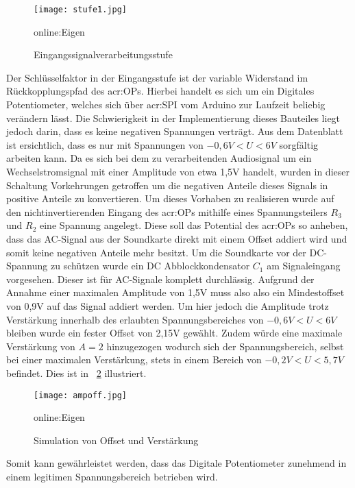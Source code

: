 \begin{figure}[H]
	\centering
	\texttt{[image: stufe1.jpg]}
	\caption[Eingangssignalverarbeitungsstufe]{Eingangssignalverarbeitungsstufe} \gls{online:Eigen}
	\label{fig:stufe1}
\end{figure}

Der Schlüsselfaktor in der Eingangsstufe ist der variable Widerstand im Rückkopplungspfad des \gls{acr:OP}s. Hierbei handelt es sich um ein Digitales Potentiometer, welches sich über \gls{acr:SPI} vom Arduino zur Laufzeit beliebig verändern lässt. Die Schwierigkeit in der Implementierung dieses Bauteiles liegt jedoch darin, dass es keine negativen Spannungen verträgt. Aus dem Datenblatt ist ersichtlich, dass es nur mit Spannungen von $-0,6V<U<6V$ sorgfältig arbeiten kann. Da es sich bei dem zu verarbeitenden Audiosignal um ein Wechselstromsignal mit einer Amplitude von etwa 1,5V handelt, wurden in dieser Schaltung Vorkehrungen getroffen um die negativen Anteile dieses Signals in positive Anteile zu konvertieren. Um dieses Vorhaben zu realisieren wurde auf den nichtinvertierenden Eingang des \gls{acr:OP}s mithilfe eines Spannungsteilers $R_{3}$ und $R_{2}$ eine Spannung angelegt. Diese soll das Potential des \gls{acr:OP}s so anheben, dass das AC-Signal aus der Soundkarte direkt mit einem Offset addiert wird und somit keine negativen Anteile mehr besitzt. Um die Soundkarte vor der DC-Spannung zu schützen wurde ein DC Abblockkondensator $C_{1}$ am Signaleingang vorgesehen. Dieser ist für AC-Signale komplett durchlässig. Aufgrund der Annahme einer maximalen Amplitude von 1,5V muss also also ein Mindestoffset von 0,9V auf das Signal addiert werden. Um hier jedoch die Amplitude trotz Verstärkung innerhalb des erlaubten Spannungsbereiches von $-0,6V<U<6V$ bleiben wurde ein fester Offset von 2,15V gewählt. Zudem würde eine maximale Verstärkung von $A=2$ hinzugezogen wodurch sich der Spannungsbereich, selbst bei einer maximalen Verstärkung, stets in einem Bereich von $-0,2V<U<5,7V$ befindet. Dies ist in ~\ref{fig:ampoff} illustriert. 

\begin{figure}[H]
	\centering
	\texttt{[image: ampoff.jpg]}
	\caption[Simulation von Offset und Verstärkung]{Simulation von Offset und Verstärkung} \gls{online:Eigen}
	\label{fig:ampoff}
\end{figure}

Somit kann gewährleistet werden, dass das Digitale Potentiometer zunehmend in einem legitimen Spannungsbereich betrieben wird.


